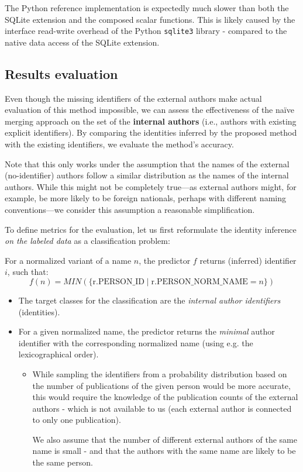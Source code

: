 The Python reference implementation is expectedly much slower than both the SQLite extension and the composed scalar functions.
This is likely caused by the interface read-write overhead of the Python \texttt{sqlite3} library - compared to the native data access of the SQLite extension.

\subsection{Results evaluation}\label{sec:results-assessment}

Even though the missing identifiers of the external authors make actual evaluation of this method impossible, 
we can assess the effectiveness of the naïve merging approach on the set of the \textbf{internal authors} (i.e., authors with existing explicit identifiers).
By comparing the identities inferred by the proposed method with the existing identifiers, we evaluate the method's accuracy.

Note that this only works under the assumption that the names of the external (no-identifier) authors follow a similar distribution as the names of the internal authors.
While this might not be completely true—as external authors might, for example, be more likely to be foreign nationals, perhaps with different naming conventions—we consider this assumption a reasonable simplification.

To define metrics for the evaluation, let us first reformulate the identity inference \textit{on the labeled data} as a classification problem:

For a normalized variant of a name $n$, the predictor $f$ returns (inferred) identifier $i$, such that:
$$
f(n) = MIN(\{\text{r.PERSON\_ID}\;|\;\text{r.PERSON\_NORM\_NAME} = n\})
$$

\begin{itemize}
    \item The target classes for the classification are the \textit{internal author identifiers} (identities). 
    \item For a given normalized name, the predictor returns the \textit{minimal} author identifier with the corresponding normalized name (using e.g. the lexicographical order).
    \begin{itemize} 
        \item While sampling the identifiers from a probability distribution based on the number of publications of the given person would be more accurate,
        this would require the knowledge of the publication counts of the external authors - which is not available to us (each external author is connected to only one publication).
        
        We also assume that the number of different external authors of the same name is small - and that the authors with the same name are likely to be the same person.
    \end{itemize}
\end{itemize}

